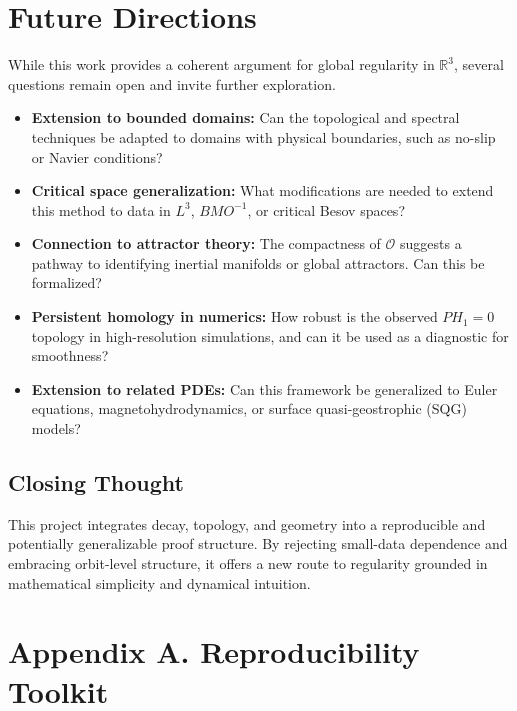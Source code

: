 \documentclass[11pt]{article}
\theoremstyle{definition}
\begin{document}
\bigskip
\section{Future Directions}
\label{sec:future}
While this work provides a coherent argument for global regularity in \( \mathbb{R}^3 \), several questions remain open and invite further exploration.

\begin{itemize}
  \item \textbf{Extension to bounded domains:} Can the topological and spectral techniques be adapted to domains with physical boundaries, such as no-slip or Navier conditions?
  \item \textbf{Critical space generalization:} What modifications are needed to extend this method to data in \( L^3 \), \( BMO^{-1} \), or critical Besov spaces?
  \item \textbf{Connection to attractor theory:} The compactness of \( \mathcal{O} \) suggests a pathway to identifying inertial manifolds or global attractors. Can this be formalized?
  \item \textbf{Persistent homology in numerics:} How robust is the observed \( PH_1 = 0 \) topology in high-resolution simulations, and can it be used as a diagnostic for smoothness?
  \item \textbf{Extension to related PDEs:} Can this framework be generalized to Euler equations, magnetohydrodynamics, or surface quasi-geostrophic (SQG) models?
\end{itemize}

\subsection*{Closing Thought}
This project integrates decay, topology, and geometry into a reproducible and potentially generalizable proof structure. By rejecting small-data dependence and embracing orbit-level structure, it offers a new route to regularity grounded in mathematical simplicity and dynamical intuition.



\section{Appendix A. Reproducibility Toolkit}
\label{sec:appendixA}
\end{document}
